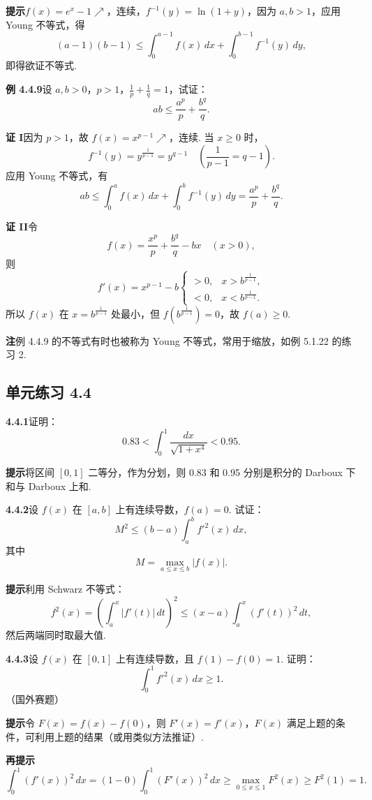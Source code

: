 \documentclass[UTF8, 12pt, fontset=fandol, oneside]{ctexart}
\begin{document}
\noindent\textbf{提示}\quad $f(x)=e^x-1\nearrow$，连续，$f^{-1}(y)=\ln(1+y)$，因为 $a,b>1$，应用 Young 不等式，得
\[
(a-1)(b-1)\le\int_0^{a-1}f(x)\,dx+\int_0^{b-1}f^{-1}(y)\,dy,
\]
即得欲证不等式.

\noindent\textbf{例 4.4.9}\quad 设 $a,b>0$，$p>1$，$\frac1p+\frac1q=1$，试证：
\[
ab\le\frac{a^p}{p}+\frac{b^q}{q}.
\]

\noindent\textbf{证 I}\quad 因为 $p>1$，故 $f(x)=x^{p-1}\nearrow$，连续. 当 $x\ge0$ 时，
\[
f^{-1}(y)=y^{\frac1{p-1}}=y^{q-1}\quad\left(\frac1{p-1}=q-1\right).
\]
应用 Young 不等式，有
\[
ab\le\int_0^a f(x)\,dx+\int_0^b f^{-1}(y)\,dy
=\frac{a^p}{p}+\frac{b^q}{q}.
\]

\noindent\textbf{证 II}\quad 令
\[
f(x)=\frac{x^p}{p}+\frac{b^q}{q}-bx\quad(x>0),
\]
则
\[
f'(x)=x^{p-1}-b
\begin{cases}
>0,& x>b^{\frac1{p-1}},\\
<0,& x<b^{\frac1{p-1}}.
\end{cases}
\]
所以 $f(x)$ 在 $x=b^{\frac1{p-1}}$ 处最小，但 $f(b^{\frac1{p-1}})=0$，故 $f(a)\ge0$.

\noindent\textbf{注}\quad 例 4.4.9 的不等式有时也被称为 Young 不等式，常用于缩放，如例 5.1.22 的练习 2.

\subsection*{单元练习 4.4}

\noindent\textbf{4.4.1}\quad 证明：
\[
0.83<\int_0^1\frac{dx}{\sqrt{1+x^4}}<0.95.
\]

\noindent\textbf{提示}\quad 将区间 $[0,1]$ 二等分，作为分划，则 0.83 和 0.95 分别是积分的 Darboux 下和与 Darboux 上和.

\noindent\textbf{4.4.2}\quad 设 $f(x)$ 在 $[a,b]$ 上有连续导数，$f(a)=0$. 试证：
\[
M^2\le(b-a)\int_a^b f'^2(x)\,dx,
\]
其中
\[
M=\max_{a\le x\le b}|f(x)|.
\]

\noindent\textbf{提示}\quad 利用 Schwarz 不等式：
\[
f^2(x)=\left(\int_a^x |f'(t)|\,dt\right)^2
\le(x-a)\int_a^x(f'(t))^2\,dt,
\]
然后两端同时取最大值.

\noindent\textbf{4.4.3}\quad 设 $f(x)$ 在 $[0,1]$ 上有连续导数，且 $f(1)-f(0)=1$. 证明：
\[
\int_0^1 f'^2(x)\,dx\ge1.
\]
（国外赛题）

\noindent\textbf{提示}\quad 令 $F(x)=f(x)-f(0)$，则 $F'(x)=f'(x)$，$F(x)$ 满足上题的条件，可利用上题的结果（或用类似方法推证）.

\noindent\textbf{再提示}\quad
\[
\int_0^1(f'(x))^2\,dx=(1-0)\int_0^1(F'(x))^2\,dx
\ge\max_{0\le x\le1}F^2(x)\ge F^2(1)=1.
\]
\end{document}

